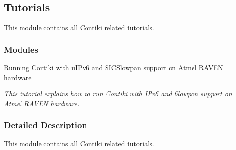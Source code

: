\hypertarget{a00073}{}\subsection{Tutorials}
\label{a00073}


This module contains all Contiki related tutorials.  


\subsubsection*{Modules}
\begin{DoxyCompactItemize}
\item 
\hyperlink{a00072}{Running Contiki with u\+I\+Pv6 and S\+I\+C\+Slowpan support on Atmel R\+A\+V\+E\+N hardware}
\begin{DoxyCompactList}\small\item\em This tutorial explains how to run Contiki with I\+Pv6 and 6lowpan support on Atmel R\+A\+V\+EN hardware. \end{DoxyCompactList}\end{DoxyCompactItemize}


\subsubsection{Detailed Description}
This module contains all Contiki related tutorials. 

